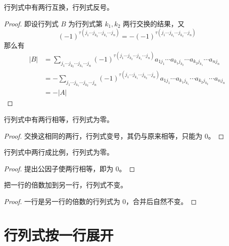 \begin{theorem}
	行列式中有两行互换，行列式反号。
\end{theorem}

\begin{proof}
	即设行列式 $B$ 为行列式第 $k_1,k_2$ 两行交换的结果，又
	\[(-1)^{\tau(j_1\cdots j_{k_2} \cdots j_{k_1} \cdots j_n)} =- (-1)^{\tau(j_1\cdots j_{k_1} \cdots j_{k_2} \cdots j_n)}\]
	那么有
	\begin{equation*}
		\begin{aligned}
			|B| & = \sum_{j_1\cdots j_{k_2} \cdots j_{k_1} \cdots j_n}(-1)^{\tau(j_1\cdots j_{k_2} \cdots j_{k_1} \cdots j_n)}
			a_{1j_1}\cdots a_{k_1j_{k_2}}\cdots a_{k_2j_{k_1}}\cdots a_{nj_n}                                                  \\
			    & =-\sum_{j_1\cdots j_{k_1} \cdots j_{k_2} \cdots j_n}(-1)^{\tau(j_1\cdots j_{k_1} \cdots j_{k_2} \cdots j_n)}
			a_{1j_1}\cdots a_{k_1j_{k_1}}\cdots a_{k_2j_{k_2}}\cdots a_{nj_n}                                                  \\
			    & =-|A|
		\end{aligned}
	\end{equation*}
\end{proof}

\begin{theorem}
	行列式中有两行相等，行列式为零。
\end{theorem}

\begin{proof}
	交换这相同的两行，行列式变号，其仍与原来相等，只能为 $0$。
\end{proof}

\begin{theorem}
	行列式中两行成比例，行列式为零。
\end{theorem}

\begin{proof}
	提出公因子使两行相等，即为 $0$。
\end{proof}

\begin{theorem}
	把一行的倍数加到另一行，行列式不变。
\end{theorem}

\begin{proof}
	一行是另一行的倍数的行列式为 $0$，合并后自然不变。
\end{proof}

\section{行列式按一行展开}

